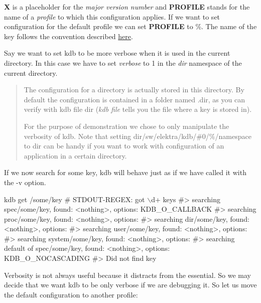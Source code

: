 {\bfseries X} is a placeholder for the {\itshape major version number} and {\bfseries P\+R\+O\+F\+I\+LE} stands for the name of a {\itshape profile} to which this configuration applies. If we want to set configuration for the default profile we can set {\bfseries P\+R\+O\+F\+I\+LE} to \%. The name of the key follows the convention described \hyperlink{md_doc_help_elektra-key-names_doc_help_elektra-key-names_md}{here}.

Say we want to set {\ttfamily kdb} to be more verbose when it is used in the current directory. In this case we have to set {\itshape verbose} to 1 in the {\itshape dir} namespace of the current directory. 
 \begin{quote}
The configuration for a directory is actually stored in this directory. By default the configuration is contained in a folder named {\ttfamily .dir}, as you can verify with {\ttfamily kdb file dir} ({\itshape kdb file} tells you the file where a key is stored in).

For the purpose of demonstration we chose to only manipulate the verbosity of kdb. Note that setting {\ttfamily dir/sw/elektra/kdb/\#0/\%/namespace} to {\ttfamily dir} can be handy if you want to work with configuration of an application in a certain directory. \end{quote}


If we now search for some key, {\ttfamily kdb} will behave just as if we have called it with the {\ttfamily -\/v} option. 
\begin{DoxyCode}
kdb get /some/key
# STDOUT-REGEX: got \(\backslash\)d+ keys
#> searching spec/some/key, found: <nothing>, options: KDB\_O\_CALLBACK
#>     searching proc/some/key, found: <nothing>, options:
#>     searching dir/some/key, found: <nothing>, options:
#>     searching user/some/key, found: <nothing>, options:
#>     searching system/some/key, found: <nothing>, options:
#>     searching default of spec/some/key, found: <nothing>, options: KDB\_O\_NOCASCADING
#> Did not find key
\end{DoxyCode}


Verbosity is not always useful because it distracts from the essential. So we may decide that we want {\ttfamily kdb} to be only verbose if we are debugging it. So let us move the default configuration to another profile\+: 


